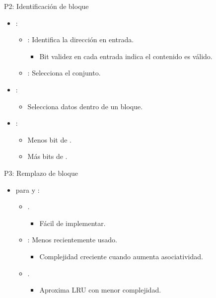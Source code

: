 \begin{frame}[t]{P2: Identificación de bloque}
\begin{itemize}
  \item {}:
    \begin{itemize}
      \item {}: Identifica la dirección en entrada.
        \begin{itemize}
          \item Bit validez en cada entrada indica el contenido es válido.
        \end{itemize}
      \item {}: Selecciona el conjunto.
    \end{itemize}

  \item {}:
    \begin{itemize}
      \item Selecciona datos dentro de un bloque.
    \end{itemize}

  \item {}:
    \begin{itemize}
      \item Menos bit de .
      \item Más bits de .
    \end{itemize}
\end{itemize}
\end{frame}

\begin{frame}[t]{P3: Remplazo de bloque}
\begin{itemize}
  \item {} para  y 
        :
    \begin{itemize}
      \item {}.
        \begin{itemize}
          \item Fácil de implementar.
        \end{itemize}
      \item {}: Menos recientemente usado.
        \begin{itemize}
          \item Complejidad creciente cuando aumenta asociatividad.
        \end{itemize}
      \item {}.
        \begin{itemize}
          \item Aproxima LRU con menor complejidad.
        \end{itemize}
    \end{itemize}
\end{itemize}

\end{frame}


